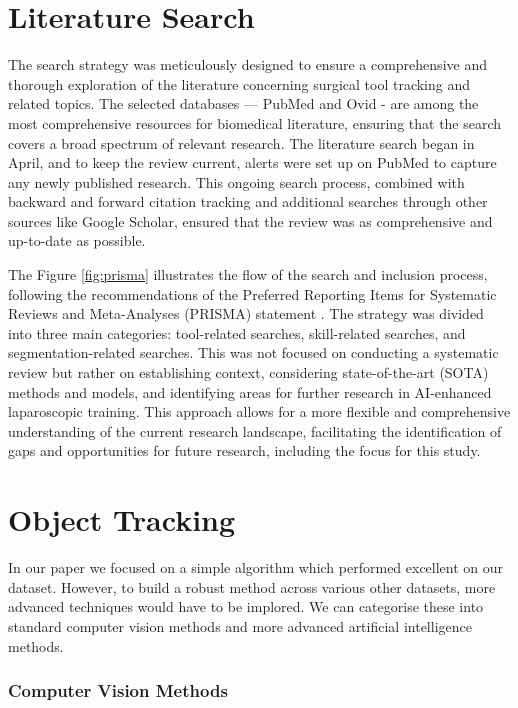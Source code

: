 \begin{multicols}{2}

\section{Literature Search}

The search strategy was meticulously designed to ensure a comprehensive and thorough exploration of the literature concerning surgical tool tracking and related topics. The selected databases — PubMed and Ovid - are among the most comprehensive resources for biomedical literature, ensuring that the search covers a broad spectrum of relevant research. The literature search began in April, and to keep the review current, alerts were set up on PubMed to capture any newly published research. This ongoing search process, combined with backward and forward citation tracking and additional searches through other sources like Google Scholar, ensured that the review was as comprehensive and up-to-date as possible.

The Figure \ref{fig:prisma} illustrates the flow of the search and inclusion process, following the recommendations of the Preferred Reporting Items for Systematic Reviews and Meta-Analyses (PRISMA) statement \cite{moher_preferred_2010}. The strategy was divided into three main categories: tool-related searches, skill-related searches, and segmentation-related searches. This was not focused on conducting a systematic review but rather on establishing context, considering state-of-the-art (SOTA) methods and models, and identifying areas for further research in AI-enhanced laparoscopic training. This approach allows for a more flexible and comprehensive understanding of the current research landscape, facilitating the identification of gaps and opportunities for future research, including the focus for this study.

\section{Object Tracking}

In our paper we focused on a simple algorithm which performed excellent on our dataset. However, to build a robust method across various other datasets, more advanced techniques would have to be implored. We can categorise these into standard computer vision methods and more advanced artificial intelligence methods.

\subsubsection{Computer Vision Methods}


\end{multicols}
